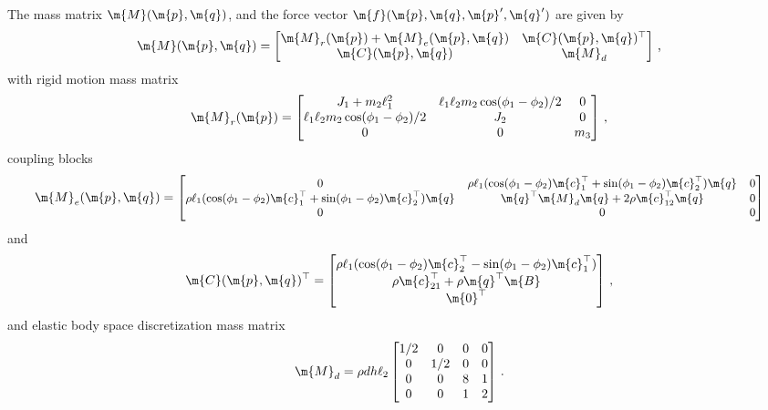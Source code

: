 %
The mass matrix $\m{M}(\m{p}, \m{q})$, and the force vector $\m{f}(\m{p}, \m{q}, \m{p}^\prime, \m{q}^\prime)$ are given by
%
\begin{equation}
  \m{M}(\m{p}, \m{q}) = \begin{bmatrix}
    \m{M}_r(\m{p}) + \m{M}_e(\m{p}, \m{q}) & \m{C}(\m{p}, \m{q})^\top \\
    \m{C}(\m{p}, \m{q})                    & \m{M}_{d}
  \end{bmatrix} \, \text{,}
\end{equation}
%
with rigid motion mass matrix
%
\begin{equation*}
  \m{M}_r(\m{p}) = \begin{bmatrix}
    J_1+m_2 \ell_1^2 & \ell_1 \ell_2 m_2 \cos(\phi_1 - \phi_2)/2 & 0 \\
    \ell_1 \ell_2 m_2 \cos(\phi_1 - \phi_2)/2 & J_2 & 0 \\
    0 & 0 & m_3
  \end{bmatrix} \, \text{,}
\end{equation*}
%
coupling blocks
%
\begin{equation*}
  \m{M}_e(\m{p}, \m{q}) = \small{\begin{bmatrix}
    0 & \rho \ell_1(\cos(\phi_1 - \phi_2)\m{c}_1^\top + \sin(\phi_1 - \phi_2)\m{c}_2^\top) \m{q} & 0 \\
    \rho \ell_1(\cos(\phi_1 - \phi_2)\m{c}_1^\top + \sin(\phi_1 - \phi_2)\m{c}_2^\top) \m{q} & \m{q}^\top\m{M}_{d}\m{q} + 2\rho\m{c}_{12}^\top\m{q} & 0 \\
    0 & 0 & 0
  \end{bmatrix}}
\end{equation*}
%
and
%
\begin{equation*}
  \m{C}(\m{p}, \m{q})^\top = \begin{bmatrix}
    \rho \ell_1(\cos(\phi_1 - \phi_2)\m{c}_2^\top - \sin(\phi_1 - \phi_2)\m{c}_1^\top) \\
    \rho\m{c}_{21}^\top + \rho\m{q}^\top\m{B} \\
    \m{0}^\top
  \end{bmatrix} \, \text{,}
\end{equation*}
%
and elastic body space discretization mass matrix
%
\begin{equation*}
  \m{M}_{d} = \rho d h \ell_2 \begin{bmatrix}
    1/2 & 0   & 0 & 0 \\
    0   & 1/2 & 0 & 0 \\
    0   & 0   & 8 & 1 \\
    0   & 0   & 1 & 2
  \end{bmatrix} \, \text{.}
\end{equation*}
